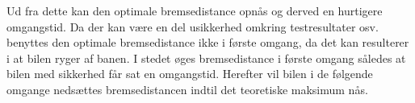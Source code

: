 Ud fra dette kan den optimale bremsedistance opnås og derved en hurtigere omgangstid. Da der kan være en del usikkerhed omkring testresultater osv. benyttes den optimale bremsedistance ikke i første omgang, da det kan resulterer i at bilen ryger af banen. I stedet øges bremsedistance i første omgang således at bilen med sikkerhed får sat en omgangstid. Herefter vil bilen i de følgende omgange nedsættes bremsedistancen indtil det teoretiske maksimum nås. \\
